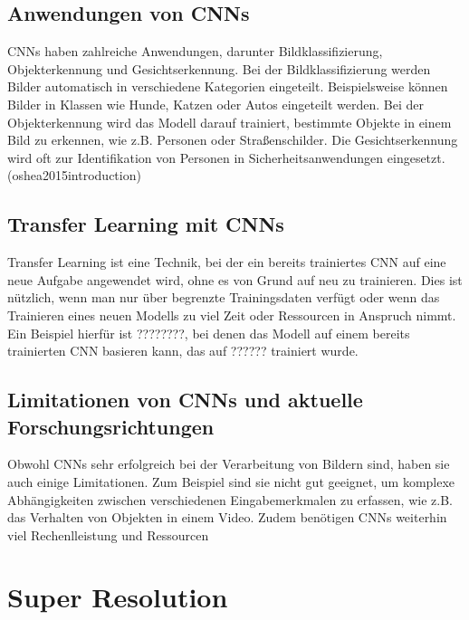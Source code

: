     
    \subsection{Anwendungen von CNNs}
    
        CNNs haben zahlreiche Anwendungen, darunter Bildklassifizierung, Objekterkennung und Gesichtserkennung. 
        Bei der Bildklassifizierung werden Bilder automatisch in verschiedene Kategorien eingeteilt. 
        Beispielsweise können Bilder in Klassen wie Hunde, Katzen oder Autos eingeteilt werden. 
        Bei der Objekterkennung wird das Modell darauf trainiert, bestimmte Objekte in einem Bild zu erkennen, wie z.B. Personen oder Straßenschilder. 
        Die Gesichtserkennung wird oft zur Identifikation von Personen in Sicherheitsanwendungen eingesetzt.
        \footfullcite(oshea2015introduction)
    \subsection{Transfer Learning mit CNNs}
    
        Transfer Learning ist eine Technik, bei der ein bereits trainiertes CNN auf eine neue Aufgabe angewendet wird, ohne es von Grund auf neu zu trainieren. 
        Dies ist nützlich, wenn man nur über begrenzte Trainingsdaten verfügt oder wenn das Trainieren eines neuen Modells zu viel Zeit oder Ressourcen in Anspruch nimmt. 
        Ein Beispiel hierfür ist ????????, bei denen das Modell auf einem bereits trainierten CNN basieren kann, das auf ?????? trainiert wurde.
    \subsection{Limitationen von CNNs und aktuelle Forschungsrichtungen}

        Obwohl CNNs sehr erfolgreich bei der Verarbeitung von Bildern sind, haben sie auch einige Limitationen. 
        Zum Beispiel sind sie nicht gut geeignet, um komplexe Abhängigkeiten zwischen verschiedenen Eingabemerkmalen zu erfassen, wie z.B. das Verhalten von Objekten in einem Video.
        Zudem benötigen CNNs weiterhin viel Rechenlleistung und Ressourcen

\section{Super Resolution}
